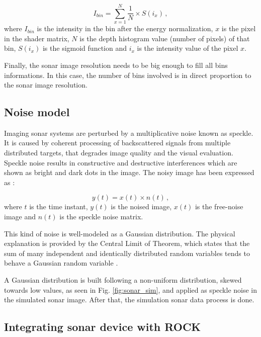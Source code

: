 \documentclass[final,5p,times]{elsarticle}
\begin{document}
\begin{equation}
    \label{eq:1}
    I_{bin} = \sum\limits_{x=1}^N \frac{1}{N} \times S(i_{x}) \, ,
\end{equation}
where $I_{bin}$ is the intensity in the bin after the energy normalization, $x$ is the pixel in the shader matrix, $N$ is the depth histogram value (number of pixels) of that bin, $S(i_{x})$ is the sigmoid function and $i_{x}$ is the intensity value of the pixel $x$.

Finally, the sonar image resolution needs to be big enough to fill all bins informations. In this case, the number of bins involved is in direct proportion to the sonar image resolution.


\subsection{Noise model}
\label{dev:noise}

Imaging sonar systems are perturbed by a multiplicative noise known as speckle. It is caused by coherent processing of backscattered signals from multiple distributed targets, that degrades image quality and the visual evaluation. Speckle noise results in constructive and destructive interferences which are shown as bright and dark dots in the image. The noisy image has been expressed as \cite{lee1980}:

\begin{equation}
\label{eq:2}
y(t) = x(t) \times n(t) \, ,
\end{equation}
where $t$ is the time instant, $y(t)$ is the noised image, $x(t)$ is the free-noise image and $n(t)$ is the speckle noise matrix.

This kind of noise is well-modeled as a Gaussian distribution. The physical explanation is provided by the Central Limit of Theorem, which states that the sum of many independent and identically distributed random variables tends to behave a Gaussian random variable \cite{papoulis2002}.

A Gaussian distribution is built following a non-uniform distribution, skewed towards low values, as seen in Fig. \ref{fig:sonar_sim}, and applied as speckle noise in the simulated sonar image. After that, the simulation sonar data process is done.

\subsection{Integrating sonar device with ROCK}
\label{dev:rock}
\end{document}
